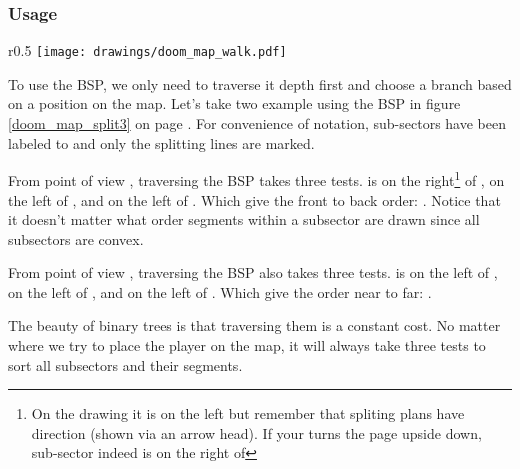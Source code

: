 \par

\subsubsection{Usage}

\begin{wrapfigure}[10]{r}{0.5\textwidth}
\centering
\texttt{[image: drawings/doom\_map\_walk.pdf]}
\end{wrapfigure}
To use the BSP, we only need to traverse it depth first and choose a branch based on a position on the map. Let's take two example using the BSP in figure \ref{doom_map_split3} on page \pageref{doom_map_split3}. For convenience of notation, sub-sectors have been labeled  to  and only the splitting lines are marked.\\
\par
From point of view , traversing the BSP takes three tests.  is on the right\footnote{On the drawing it is on the left but remember that spliting plans have direction (shown via an arrow head). If your turns the page upside down, sub-sector  indeed is on the right of } of , on the left of , and on the left of . Which give the front to back order: . Notice that it doesn't matter what order segments within a subsector are drawn since all subsectors are convex.\\
\par
From point of view , traversing the BSP also takes three tests.  is on the left of , on the left of , and on the left of . Which give the order near to far: .\\
\par
The beauty of binary trees is that traversing them is a constant cost. No matter where we try to place the player on the map, it will always take three tests to sort all subsectors and their segments.
\pagebreak




